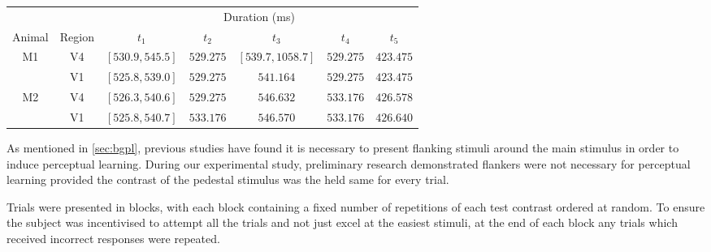\begin{table}[bthp]
{%
%
\begin{tabular}{ccccccc}
\toprule
        &       & \multicolumn{5}{c}{Duration (\si{\milli\second})} \\
\cmidrule(l){3-7}
Animal  & Region& $t_1$            & $t_2$     & $t_3$             & $t_4$     & $t_5$     \\
\midrule
M1      & V4    & $[530.9, 545.5]$ & $529.275$ & $[539.7, 1058.7]$ & $529.275$ & $423.475$ \\
        & V1    & $[525.8, 539.0]$ & $529.275$ & $541.164$         & $529.275$ & $423.475$ \\
M2      & V4    & $[526.3, 540.6]$ & $529.275$ & $546.632$         & $533.176$ & $426.578$ \\
        & V1    & $[525.8, 540.7]$ & $533.176$ & $546.570$         & $533.176$ & $426.640$ \\
\bottomrule
%
\end{tabular}
} %
\end{table}


As mentioned in \autoref{sec:bgpl}, previous studies have found it is necessary to present flanking stimuli around the main stimulus in order to induce perceptual learning.
During our experimental study, preliminary research demonstrated flankers were not necessary for perceptual learning provided the contrast of the pedestal stimulus was the held same for every trial.

Trials were presented in blocks, with each block containing a fixed number of repetitions of each test contrast ordered at random.
To ensure the subject was incentivised to attempt all the trials and not just excel at the easiest stimuli, at the end of each block any trials which received incorrect responses were repeated.


